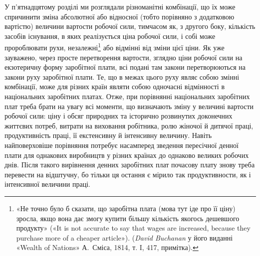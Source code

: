 У п’ятнадцятому розділі ми розглядали різноманітні комбінації,
що їх може спричинити зміна абсолютної або відносної
(тобто порівняно з додатковою вартістю) величини вартости робочої
сили, тимчасом як, з другого боку, кількість засобів існування,
в яких реалізується ціна робочої сили, і собі може пророблювати
рухи, незалежні\footnote{
«Не точно було б сказати, що заробітна плата (мова тут іде про
її ціну) зросла, якщо вона дає змогу купити більшу кількість якогось
дешевшого продукту» («It is not accurate to say that wages are increased,
because they purchase more of a cheaper article»). (\emph{David Buchanan}
у його виданні «Wealth of Nations» А.~Сміса, 1814, т. I, \stor{}417,
примітка).
} або відмінні від зміни цієї ціни. Як уже зауважено,
через просте перетворення вартости, зглядно ціни робочої
сили на екзотеричну форму заробітної плати, всі подані там
закони перетворюються на закони руху заробітної плати. Те,
що в межах цього руху являє собою змінні комбінації, може для
різних країн являти собою одночасні відмінності в національних
заробітних платах. Отже, при порівнянні національних заробітних
плат треба брати на увагу всі моменти, що визначають зміну
у величині вартости робочої сили: ціну і обсяг природних та
історично розвинутих доконечних життєвих потреб, витрати
на виховання робітника, ролю жіночої й дитячої праці, продуктивність
праці, її екстенсивну й інтенсивну величину. Навіть
найповерховіше порівняння потребує насамперед зведення пересічної
денної плати для однакових виробництв у різних країнах
до однаково великих робочих днів. Після такого вирівнення денних
заробітних плат почасову плату знову треба перевести на
відштучну, бо тільки ця остання є мірило так продуктивности,
як і інтенсивної величини праці.
